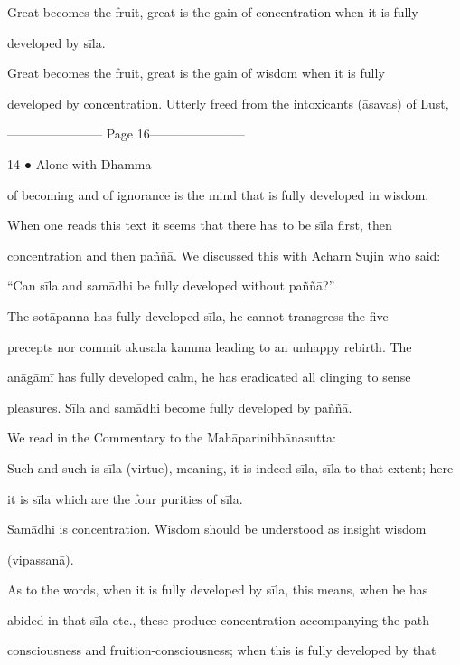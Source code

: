          Great becomes the fruit, great is the gain of concentration when it is fully  

      developed by sīla. 

         Great becomes the fruit, great is the gain of wisdom when it is fully  

      developed by concentration. Utterly freed from the intoxicants (āsavas) of Lust,  


----------------------- Page 16-----------------------

14 ● Alone with Dhamma 



      of becoming and of ignorance is the mind that is fully developed in wisdom. 



When   one   reads   this   text   it   seems   that   there   has   to   be   sīla   first,   then  

concentration and then paññā. We discussed this with Acharn Sujin who said:  

“Can sīla and samādhi be fully developed without paññā?” 

   The   sotāpanna   has   fully   developed   sīla,   he   cannot   transgress   the   five  

precepts   nor   commit   akusala   kamma   leading   to   an   unhappy   rebirth.   The  

anāgāmī  has   fully   developed  calm,  he  has   eradicated  all  clinging  to  sense  

pleasures. Sīla and samādhi become fully developed by paññā. 



We read in the Commentary to the Mahāparinibbānasutta: 



      Such and such is sīla (virtue), meaning, it is indeed sīla, sīla to that extent; here  

      it is sīla which are the four purities of sīla.  

         Samādhi is concentration. Wisdom should be understood as insight wisdom  

      (vipassanā). 

         As to the words, when it is fully developed by sīla, this means, when he has  

      abided in that sīla etc., these produce concentration accompanying the path- 

      consciousness and fruition-consciousness; when this is fully developed by that  

